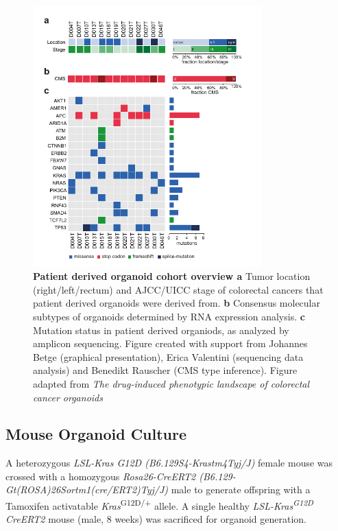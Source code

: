 \begin{flushleft}
\begin{figure}[!h]
\centering
\includegraphics[width=250pt,
                height=\textheight,
                keepaspectratio]{figures/promise/pdf/fig_1_0.pdf}
\caption[Patient derived organoid cohort overview]{\textbf{Patient derived organoid cohort overview a} Tumor location (right/left/rectum) and AJCC/UICC stage of colorectal cancers that patient derived organoids were derived from. \textbf{b}  Consensus molecular subtypes of organoids determined by RNA expression analysis. \textbf{c} Mutation status in patient derived organiods, as analyzed by amplicon sequencing. Figure created with support from Johannes Betge (graphical presentation),  Erica Valentini (sequencing data analysis) and Benedikt Rauscher (CMS type inference). Figure adapted from \textit{The drug-induced phenotypic landscape of colorectal cancer organoids} \parencite{betgeDruginducedPhenotypicLandscape2022}}
\label{fig_120}
\end{figure}


\subsection{Mouse Organoid Culture}
A heterozygous \textit{LSL-Kras G12D (B6.129S4-Krastm4Tyj/J)} female mouse \parencite{jacksonAnalysisLungTumor2001} was crossed with a homozygous \textit{Rosa26-CreERT2 (B6.129-Gt(ROSA)26Sortm1(cre/ERT2)Tyj/J)} male to generate offspring with a Tamoxifen activatable \textit{Kras}\textsuperscript{G12D/+} allele. A single healthy \textit{LSL-Kras\textsuperscript{G12D} CreERT2} mouse (male, 8 weeks) was sacrificed for organoid generation. \par 


\end{flushleft}
